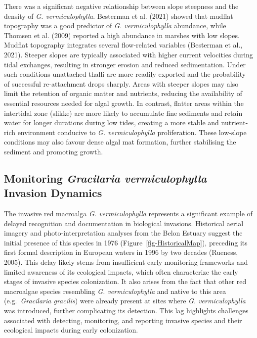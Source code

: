 \documentclass[
  letterpaper,
  DIV=11,
  numbers=noendperiod]{scrartcl}
\begin{document}
There was a significant negative relationship between slope steepness
and the density of \emph{G. vermiculophylla}. Besterman et al. (2021)
showed that mudflat topography was a good predictor of \emph{G.
vermiculophylla} abundance, while Thomsen et al. (2009) reported a high
abundance in marshes with low slopes. Mudflat topography integrates
several flow-related variables (Besterman et al., 2021). Steeper slopes
are typically associated with higher current velocities during tidal
exchanges, resulting in stronger erosion and reduced sedimentation.
Under such conditions unattached thalli are more readily exported and
the probability of successful re-attachment drops sharply. Areas with
steeper slopes may also limit the retention of organic matter and
nutrients, reducing the availability of essential resources needed for
algal growth. In contrast, flatter areas within the intertidal zone
(slikke) are more likely to accumulate fine sediments and retain water
for longer durations during low tides, creating a more stable and
nutrient-rich environment conducive to \emph{G. vermiculophylla}
proliferation. These low-slope conditions may also favour dense algal
mat formation, further stabilising the sediment and promoting growth.

\subsection{\texorpdfstring{Monitoring \emph{Gracilaria vermiculophylla}
Invasion
Dynamics}{Monitoring Gracilaria vermiculophylla Invasion Dynamics}}\label{monitoring-gracilaria-vermiculophylla-invasion-dynamics}

The invasive red macroalga \emph{G. vermiculophylla} represents a
significant example of delayed recognition and documentation in
biological invasions. Historical aerial imagery and photo-interpretation
analyses from the Belon Estuary suggest the initial presence of this
species in 1976 (Figure~\ref{fig-HistoricalMap}), preceding its first
formal description in European waters in 1996 by two decades (Rueness,
2005). This delay likely stems from insufficient early monitoring
frameworks and limited awareness of its ecological impacts, which often
characterize the early stages of invasive species colonization. It also
arises from the fact that other red macroalgae species resembling
\emph{G. vermiculophylla} and native to this area (e.g.~\emph{Gracilaria
gracilis}) were already present at sites where \emph{G. vermiculophylla}
was introduced, further complicating its detection. This lag highlights
challenges associated with detecting, monitoring, and reporting invasive
species and their ecological impacts during early colonization.
\end{document}
